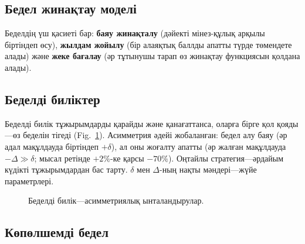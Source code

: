 \documentclass[11pt,a4paper,twocolumn]{article}
\begin{document}
\subsection{Бедел жинақтау моделі}

Беделдің үш қасиеті бар: \textbf{баяу жинақталу} (дәйекті мінез-құлық арқылы біртіндеп өсу), \textbf{жылдам жойылу} (бір алаяқтық баллды апатты түрде төмендете алады) және \textbf{жеке бағалау} (әр тұтынушы тарап өз жинақтау функциясын қолдана алады).

\subsection{Беделді биліктер}

Беделді билік тұжырымдарды қарайды және қанағаттанса, оларға бірге қол қояды---өз беделін тігеді (Fig.~\ref{fig:authority}). Асимметрия әдейі жобаланған: бедел алу баяу (әр адал мақұлдауда біртіндеп $+\delta$), ал оны жоғалту апатты (әр жалған мақұлдауда $-\Delta \gg \delta$; мысал ретінде $+2\%$-ке қарсы $-70\%$). Оңтайлы стратегия---әрдайым күдікті тұжырымдардан бас тарту. $\delta$ мен $\Delta$-ның нақты мәндері---жүйе параметрлері.

\begin{figure}[ht]
\centering
{}
\caption{Беделді билік---асимметриялық ынталандырулар.}
\label{fig:authority}
\end{figure}

\subsection{Көпөлшемді бедел}
\end{document}

